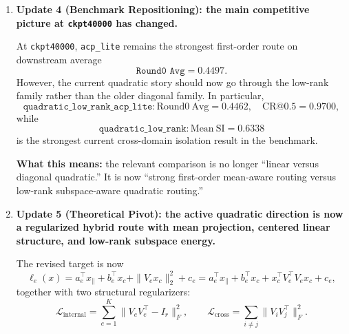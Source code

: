 \documentclass[11pt]{article}
\begin{document}
\begin{enumerate}
    The coarse audit shows that raw first-order features remain best aligned with the coarse semantic labels:
    \[
    \texttt{raw\_x\_raw}: \mathrm{NMI}=0.3114,\quad \mathrm{ARI}=0.2230,\quad \mathrm{PMA}=0.4670,
    \]
    while diagonal second-order and projected second-order representations remain weak on these semantic metrics. At the same time, pure subspace energy produces a very high geometric separation score,
    \[
    \texttt{energy\_first\_pca}: \mathrm{Silhouette}=0.5005,
    \]
    but still poor semantic alignment
    \[
    \mathrm{NMI}=0.0277,\qquad \mathrm{ARI}=0.0052,\qquad \mathrm{PMA}=0.2712.
    \]

    \textbf{What this means:} not every second-order signal is semantic, and not every geometrically separable quantity is useful for routing. The clustering audit therefore argues against keeping the old diagonal second-order story as the main scientific claim.

    \item \textbf{Update 4 (Benchmark Repositioning): the main competitive picture at \texttt{ckpt40000} has changed.}

    At \texttt{ckpt40000}, \texttt{acp\_lite} remains the strongest first-order route on downstream average
    \[
    \texttt{Round0 Avg}=0.4497.
    \]
    However, the current quadratic story should now go through the low-rank family rather than the older diagonal family. In particular,
    \[
    \texttt{quadratic\_low\_rank\_acp\_lite}: \mathrm{Round0\ Avg}=0.4462,\quad \mathrm{CR@0.5}=0.9700,
    \]
    while
    \[
    \texttt{quadratic\_low\_rank}: \mathrm{Mean\ SI}=0.6338
    \]
    is the strongest current cross-domain isolation result in the benchmark.

    \textbf{What this means:} the relevant comparison is no longer ``linear versus diagonal quadratic.'' It is now ``strong first-order mean-aware routing versus low-rank subspace-aware quadratic routing.''

    \item \textbf{Update 5 (Theoretical Pivot): the active quadratic direction is now a regularized hybrid route with mean projection, centered linear structure, and low-rank subspace energy.}

    The revised target is now
    \[
    \ell_e(x)
    =
    a_e^\top x_{\parallel}
    +
    b_e^\top x_c
    +
    \|V_e x_c\|_2^2
    +
    c_e
    =
    a_e^\top x_{\parallel}
    +
    b_e^\top x_c
    +
    x_c^\top V_e^\top V_e x_c
    +
    c_e,
    \]
    together with two structural regularizers:
    \[
    \mathcal{L}_{\mathrm{internal}}
    =
    \sum_{e=1}^{K}\|V_eV_e^\top-I_r\|_F^2,
    \qquad
    \mathcal{L}_{\mathrm{cross}}
    =
    \sum_{i\neq j}\|V_iV_j^\top\|_F^2.
    \]


\end{enumerate}
\end{document}
